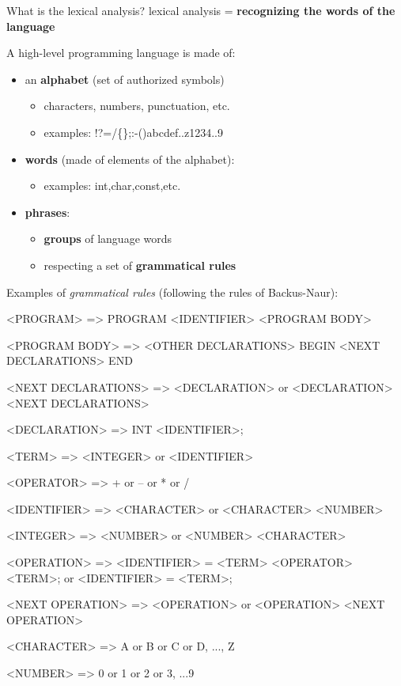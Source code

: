 \documentclass{beamer}[10pt, usepdftitle=false, handout]
\begin{document}
	\begin{frame}
	
	\begin{block}{What is the lexical analysis?}
	lexical analysis = \textbf{recognizing the words of the language}
	\end{block}
	\vspace*{1em}
	A high-level programming language is made of:
	\vspace*{1em}
	\begin{itemize}
	\item{an \textbf{alphabet} (set of authorized symbols)
		\begin{itemize}
			\item{characters, numbers, punctuation, etc.}
			\item{examples: !?=/\{\};:-()abcdef..z1234..9}
		\end{itemize}			
	}
	\item{\textbf{words} (made of elements of the alphabet):
		\begin{itemize}
		\item{examples: int,char,const,etc.}
		\end{itemize}			
	}	
	\item{\textbf{phrases}:
		\begin{itemize}
			\item{\textbf{groups} of language words}
			\item{respecting a set of \textbf{grammatical rules}}
		\end{itemize}			
	}
	
	\end{itemize}
	
	\end{frame}

	\begin{frame}

	Examples of \textit{grammatical rules} (following the rules of Backus-Naur):
	\vspace*{1em}
	
	<PROGRAM> => PROGRAM <IDENTIFIER> <PROGRAM BODY> 
	
	<PROGRAM BODY> => <OTHER DECLARATIONS> BEGIN <NEXT DECLARATIONS> END
	
	<NEXT DECLARATIONS> => <DECLARATION> or <DECLARATION> <NEXT DECLARATIONS>

	<DECLARATION> => INT <IDENTIFIER>;
	
	<TERM> => <INTEGER> or <IDENTIFIER>

	<OPERATOR> => + or – or * or /

	<IDENTIFIER> => <CHARACTER> or <CHARACTER> <NUMBER>

	<INTEGER> => <NUMBER> or <NUMBER> <CHARACTER>

	<OPERATION> => <IDENTIFIER> = <TERM> <OPERATOR> <TERM>; or <IDENTIFIER> = <TERM>;

	<NEXT OPERATION> => <OPERATION> or <OPERATION> <NEXT OPERATION>

	<CHARACTER> =>  A or B or C or D, ..., Z

	<NUMBER> => 0 or 1 or 2 or 3, ...9 	
	
	\end{frame}
\end{document}
